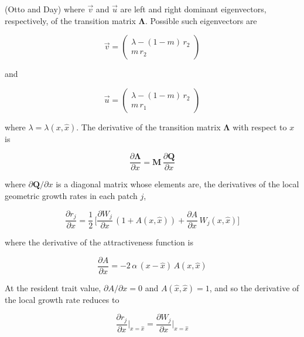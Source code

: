 (Otto and Day) where $\overrightarrow{v}$ and $\overrightarrow{u}$ are left and right dominant eigenvectors, respectively, of the transition matrix $\pmb{\Lambda}$. Possible such eigenvectors are

\begin{equation}
    \overrightarrow{v} = 
    \begin{pmatrix}
        \lambda - (1-m)\,r_2 \\
        m\,r_2 
    \end{pmatrix}
    \label{eq:left_eigenvector}
\end{equation}

and

\begin{equation}
    \overrightarrow{u} = 
    \begin{pmatrix}
        \lambda - (1-m)\,r_2 \\
        m\,r_1
    \end{pmatrix}
\end{equation}

where $\lambda = \lambda(x, \hat x)$. The derivative of the transition matrix $\pmb\Lambda$ with respect to $x$ is

\begin{equation}
    \frac{\partial \pmb{\Lambda}}{\partial x} = \pmb{M} \, \frac{\partial \pmb{Q}}{\partial x}
\end{equation}

where $\partial \pmb{Q} / \partial x$ is a diagonal matrix whose elements are, the derivatives of the local geometric growth rates in each patch $j$,

\begin{equation}
    \frac{\partial r_j}{\partial x} = \frac{1}{2} \, \bigg[\frac{\partial W_j}{\partial x} \, (1 + A(x, \hat{x})) + \frac{\partial A}{\partial x} \, W_j(x, \hat{x})\bigg]
    \label{eq:deriv_local_growth}
\end{equation}

where the derivative of the attractiveness function is

\begin{equation}
    \frac{\partial A}{\partial x} = -2 \, \alpha \, (x - \hat{x}) \, A(x, \hat{x})
\end{equation}

At the resident trait value, $\partial A / \partial x = 0$ and $A(\hat{x},\hat{x}) = 1$, and so the derivative of the local growth rate reduces to

\begin{equation}
    \frac{\partial r_j}{\partial x}\bigg|_{x=\hat{x}} = \frac{\partial W_j}{\partial x}\bigg|_{x=\hat{x}} 
\end{equation}


